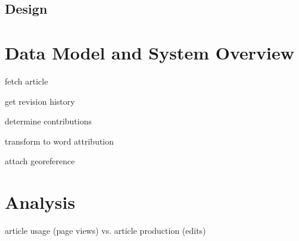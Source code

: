 \subsection{Design}


\section{Data Model and System Overview}

\begin{todos}
    \item fetch article
    \item get revision history
    \item determine contributions
    \item transform to word attribution
    \item attach georeference 
\end{todos}

\section{Analysis}

\begin{todos}
    \item article usage (page views) vs. article production (edits)
    \item 
    \item 
    \item
    \item 
\end{todos}


